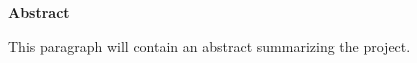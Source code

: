 \thispagestyle{plain}

\vspace{0.9cm}
\textbf{Abstract}

This paragraph will contain an abstract summarizing the project.